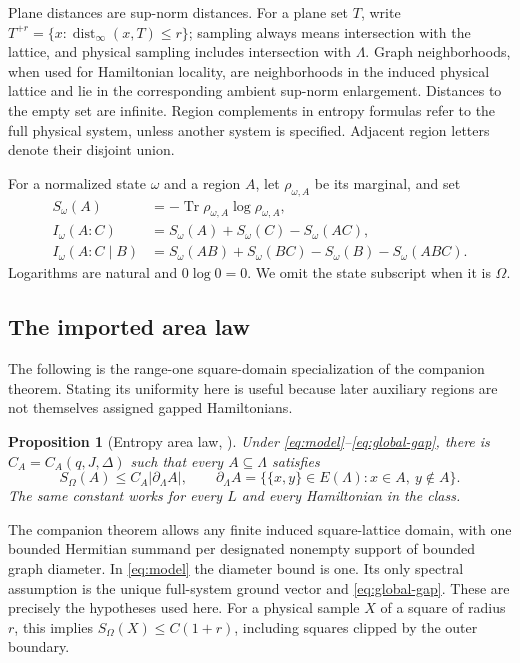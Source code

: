 \documentclass[11pt]{article}
\numberwithin{equation}{section}
\newtheorem{proposition}[theorem]{Proposition}
\theoremstyle{definition}
\theoremstyle{remark}
\DeclareMathOperator{\Tr}{Tr}
\DeclareMathOperator{\dist}{dist}
\begin{document}
Plane distances are sup-norm distances. For a plane set $T$, write
$T^{+r}=\{x:\dist_\infty(x,T)\le r\}$; sampling always means intersection
with the lattice, and physical sampling includes intersection with $\Lambda$.
Graph neighborhoods, when used for Hamiltonian locality, are neighborhoods
in the induced physical lattice and lie in the corresponding ambient
sup-norm enlargement. Distances to the empty set are infinite. Region
complements in entropy formulas refer to the full physical system, unless
another system is specified. Adjacent region letters denote their disjoint
union.

For a normalized state $\omega$ and a region $A$, let $\rho_{\omega,A}$
be its marginal, and set
\begin{align*}
 S_\omega(A)&=-\Tr\rho_{\omega,A}\log\rho_{\omega,A},\\
 I_\omega(A:C)&=S_\omega(A)+S_\omega(C)-S_\omega(AC),\\
 I_\omega(A:C\mid B)&=S_\omega(AB)+S_\omega(BC)
                    -S_\omega(B)-S_\omega(ABC).
\end{align*}
Logarithms are natural and $0\log0=0$. We omit the state subscript when it
is $\Omega$.

\subsection{The imported area law}

The following is the range-one square-domain specialization of the companion
theorem. Stating its uniformity here is useful because later auxiliary
regions are not themselves assigned gapped Hamiltonians.

\begin{proposition}[Entropy area law, {\cite[Theorem~1.1 and Corollary~1.2]{RepoAreaLaw}}]
\label{prop:area-law}
Under \eqref{eq:model}--\eqref{eq:global-gap}, there is
$C_A=C_A(q,J,\Delta)$ such that every $A\subseteq\Lambda$ satisfies
\[
 S_\Omega(A)\le C_A|\partial_\Lambda A|,
 \qquad
 \partial_\Lambda A=\{\{x,y\}\in E(\Lambda):x\in A,
                                      \ y\notin A\}.
\]
The same constant works for every $L$ and every Hamiltonian in the class.
\end{proposition}

The companion theorem allows any finite induced square-lattice domain, with one
bounded Hermitian summand per designated nonempty support of bounded graph
diameter. In \eqref{eq:model} the diameter bound is one. Its only spectral
assumption is the unique full-system ground vector and
\eqref{eq:global-gap}. These are precisely the hypotheses used here.
For a physical sample $X$ of a square of radius $r$, this implies
$S_\Omega(X)\le C(1+r)$, including squares clipped by the outer boundary.
\end{document}
